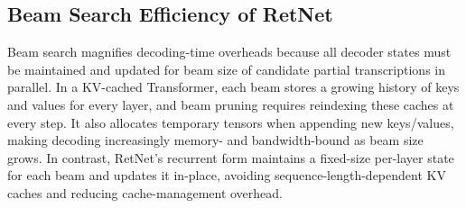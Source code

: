 \documentclass[times, review, 10pt]{elsarticle}
\begin{document}
\subsection{Beam Search Efficiency of RetNet}
Beam search magnifies decoding-time overheads because all decoder states must be maintained and updated for beam size of candidate partial transcriptions in parallel. In a KV-cached Transformer, each beam stores a growing history of keys and values for every layer, and beam pruning requires reindexing these caches at every step. It also allocates temporary tensors when appending new keys/values, making decoding increasingly memory- and bandwidth-bound as beam size grows. In contrast, RetNet’s recurrent form maintains a fixed-size per-layer state for each beam and updates it in-place, avoiding sequence-length-dependent KV caches and reducing cache-management overhead.
\end{document}
